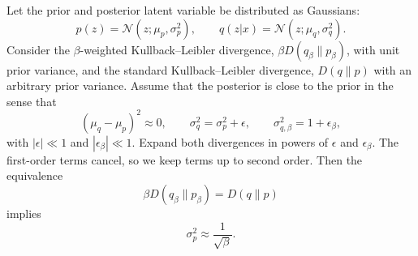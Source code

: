 \documentclass[twoside,11pt]{article}
\begin{document}
\begin{lemma}
\label{lemma:beta_prior_equivalence}
Let the prior and posterior latent variable be distributed as Gaussians:
\[
p(z) = \mathcal{N}(z;\mu_p,\sigma_p^2), 
\qquad
q(z|x) = \mathcal{N}(z;\mu_q,\sigma_q^2).
\]
Consider the $\beta$-weighted Kullback–Leibler divergence, $\beta D(q_\beta\|p_\beta)$, with unit prior variance, and the standard Kullback–Leibler divergence, $D(q\|p)$ with an arbitrary prior variance. Assume that the posterior is close to the prior in the sense that
\[
(\mu_q-\mu_p)^2 \approx 0,
\qquad
\sigma_q^2 = \sigma_p^2 + \epsilon,
\qquad
\sigma_{q,\beta}^2 = 1 + \epsilon_\beta,
\]
with $|\epsilon| \ll 1$ and $|\epsilon_\beta| \ll 1$. Expand both divergences in powers of $\epsilon$ and $\epsilon_\beta$. The first-order terms cancel, so we keep terms up to second order. Then the equivalence
\[
\beta D(q_\beta\|p_\beta) = D(q\|p)
\]
implies
\begin{equation}
\sigma_p^2 \approx \frac{1}{\sqrt{\beta}}.
\label{eq:beta_prior_equivalence_final}
\end{equation}
\end{lemma}
\end{document}
